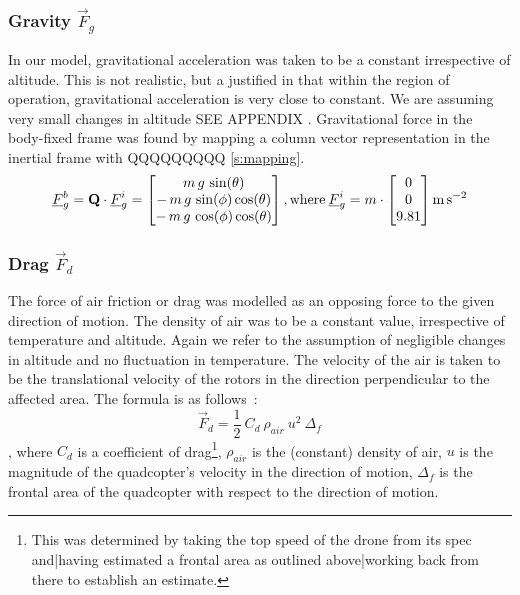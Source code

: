 \subsubsection{Gravity $\vec{F}_g$}
In our model, gravitational acceleration was taken to be a constant irrespective of altitude. This is not realistic, but a justified in that within the region of operation, gravitational acceleration is very close to constant. We are assuming very small changes in altitude SEE APPENDIX .
Gravitational force in the body-fixed frame was found by mapping a column vector representation in the inertial frame with QQQQQQQQQ  \cref{s:mapping}.
\\
$$
\underline{F}_g^b = \textbf{Q}\cdot\underline{F}_g^i = \begin{bmatrix}
m\,g\,\sin(\theta)\\-\,m\,g\,\sin(\phi)\cos(\theta)\\-\,m\,g\,\cos(\phi)\cos(\theta)
\end{bmatrix}
\mathrm{, where }\:
\underline{F}_g^i = m\cdot\begin{bmatrix}
0\\0\\9.81
\end{bmatrix}
\si{\metre\per\second\squared}
$$

\subsubsection{Drag $\vec{F}_d$}
The force of air friction or drag was modelled as an opposing force to the given direction of motion. The density of air was to be a constant value, irrespective of temperature and altitude. Again we refer to the assumption of negligible changes in altitude and no fluctuation in temperature. The velocity of the air is taken to be the translational velocity of the rotors in the direction perpendicular to the affected area. The formula is as follows~:
\begin{equation}
\label{eqn:drag}
\vec{F}_d = \frac{1}{2}\:C_d\:\rho_{air}\:u^2\:\Delta_f
\end{equation}
, where $C_d$ is a coefficient of drag\footnote{This was determined by taking the top speed of the drone from its spec \cite{drone-spec} and|having estimated a frontal area as outlined above|working back from there to establish an estimate. }, $\rho_{air}$ is the (constant) density of air, $u$ is the magnitude of the quadcopter's velocity in the direction of motion, $\Delta_f$ is the frontal area of the quadcopter with respect to the direction of motion.

